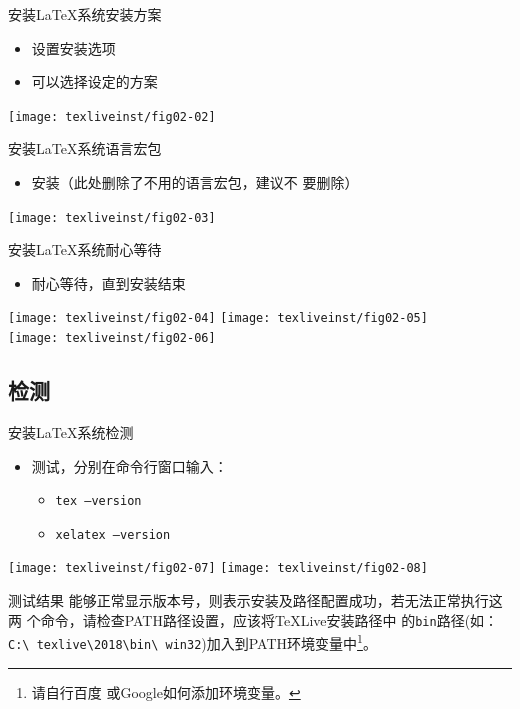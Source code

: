 \documentclass[xcolor=svgnames, t]{ctexbeamer}
\begin{document}
\begin{frame}[t]{安装\LaTeX 系统}{安装方案}
  \begin{itemize}
  \item 设置安装选项
  \item 可以选择设定的方案
  \end{itemize}
  \centering
  \texttt{[image: texliveinst/fig02-02]}
\end{frame}

\begin{frame}[t]{安装\LaTeX 系统}{语言宏包}
  \begin{itemize}
  \item 安装（此处删除了不用的语言宏包，\alert{建议不
      要删除}）
  \end{itemize}
  \centering
  \texttt{[image: texliveinst/fig02-03]}
\end{frame}

\begin{frame}[t]{安装\LaTeX 系统}{耐心等待}
  \stretchon
  \begin{itemize}
  \item 耐心等待，直到安装结束
  \end{itemize}
  \centering
  \texttt{[image: texliveinst/fig02-04]} \qquad
  \texttt{[image: texliveinst/fig02-05]}
  \\[4ex]
  \texttt{[image: texliveinst/fig02-06]}
  \stretchoff
\end{frame}
\subsection[检测]{检测\TeXLive }
\begin{frame}[t]{安装\LaTeX 系统}{检测\TeXLive }
  \stretchon
  \begin{itemize}
  \item 测试，分别在命令行窗口输入：
    \begin{itemize}
    \item {\texttt{tex --version}}
    \item {\texttt{xelatex --version}}
    \end{itemize}
  \end{itemize}
  \centering 
  \texttt{[image: texliveinst/fig02-07]}
  \qquad
  \texttt{[image: texliveinst/fig02-08]}
  \begin{minipage}[h]{0.6\linewidth}
    \begin{block}{测试结果}
      \scriptsize      
      能够正常显示版本号，则表示安装及路径配置成功，若无法正常执行这两
      个命令，请检查PATH路径设置，应该将{\TeX}Live安装路径中
      的\texttt{bin}路径(如：\texttt{C:\textbackslash
        texlive\textbackslash 2018\textbackslash bin\textbackslash
        win32})加入到PATH环境变量中\footnote[frame]{请自行百度
        或Google如何添加环境变量。}。
    \end{block}
  \end{minipage}
  \stretchoff
\end{frame}
\end{document}
